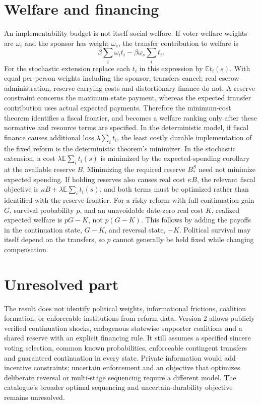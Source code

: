 \documentclass[11pt]{article}
\theoremstyle{definition}
\begin{document}
\section*{Welfare and financing}
An implementability budget is not itself social welfare. If voter welfare weights are $\omega_i$ and the sponsor has weight $\omega_s$, the transfer contribution to welfare is
\[
 \beta\sum_i\omega_i t_i-\beta\omega_s\sum_i t_i.
\]
For the stochastic extension replace each $t_i$ in this expression by $\mathbb E t_i(s)$. With equal per-person weights including the sponsor, transfers cancel; real escrow administration, reserve carrying costs and distortionary finance do not. A reserve constraint concerns the maximum state payment, whereas the expected transfer contribution uses actual expected payments. Therefore the minimum-cost theorem identifies a fiscal frontier, and becomes a welfare ranking only after these normative and resource terms are specified. In the deterministic model, if fiscal finance causes additional loss $\lambda\sum_i t_i$, the least costly durable implementation of the fixed reform is the deterministic theorem's minimizer. In the stochastic extension, a cost $\lambda\mathbb E\sum_i t_i(s)$ is minimized by the expected-spending corollary at the available reserve $B$. Minimizing the required reserve $B_*^S$ need not minimize expected spending. If holding reserves also causes real cost $\kappa B$, the relevant fiscal objective is $\kappa B+\lambda\mathbb E\sum_i t_i(s)$, and both terms must be optimized rather than identified with the reserve frontier.
For a risky reform with full continuation gain $G$, survival probability $p$, and an unavoidable date-zero real cost $K$, realized expected welfare is $pG-K$, not $p(G-K)$. This follows by adding the payoffs in the continuation state, $G-K$, and reversal state, $-K$. Political survival may itself depend on the transfers, so $p$ cannot generally be held fixed while changing compensation.

\section*{Unresolved part}
The result does not identify political weights, informational frictions, coalition formation, or enforceable institutions from reform data. Version 2 allows publicly verified continuation shocks, endogenous statewise supporter coalitions and a shared reserve with an explicit financing rule. It still assumes a specified sincere voting selection, common known probabilities, enforceable contingent transfers and guaranteed continuation in every state. Private information would add incentive constraints; uncertain enforcement and an objective that optimizes deliberate reversal or multi-stage sequencing require a different model. The catalogue's broader optimal sequencing and uncertain-durability objective remains unresolved.
\end{document}
